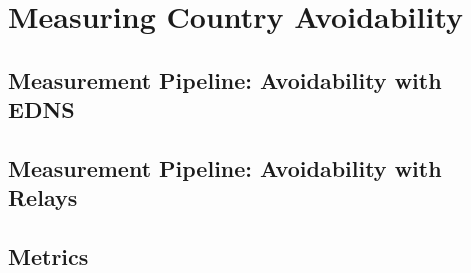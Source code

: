 \section{Measuring Country Avoidability}

\subsection{Measurement Pipeline: Avoidability with EDNS}

\subsection{Measurement Pipeline: Avoidability with Relays}

\subsection{Metrics}


